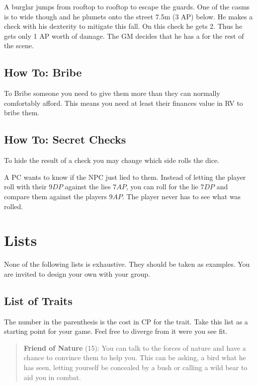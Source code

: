 \documentclass[11pt]{article}
\begin{document}
{\begin{pwexample}
A burglar jumps from rooftop to rooftop to escape the guards. One of the casms is to wide though and he plumets onto the street 7.5m (3 AP) below. He makes a check with his dexterity to mitigate this fall. On this check he gets 2. Thus he gets only 1 AP worth of damage. The GM decides that he has a  for the rest of the scene.
\end{pwexample}
\subsection{How To: Bribe}
\label{sec:orge31ccdb}
To Bribe someone you need to give them more than they can normally comfortably afford. This means you need at least their finances value in RV to bribe them.
\subsection{How To: Secret Checks}
\label{sec:org307faa0}
To hide the result of a check you may change which side rolls the dice.

\begin{pwexample}
A PC wants to know if the NPC just lied to them. Instead of letting the player roll with their \(9 DP\) against the lies \(7 AP\), you can roll for the lie \(7 DP\) and compare them against the players \(9 AP\). The player never has to see what was rolled.
\end{pwexample}
\section{Lists}
\label{sec:org2a09064}
None of the following lists is exhaustive. They should be taken as examples. You are invited to design your own with your group.
\subsection{List of Traits}
\label{sec:orgdba11b8}
The number in the parenthesis is the cost in CP for the trait. Take this list as a starting point for your game. Feel free to diverge from it were you see fit.

\begin{quote}
\textbf{Friend of Nature} (15): You can talk to the forces of nature and have a chance to convince them to help you. This can be asking, a bird what he has seen, letting yourself be concealed by a bush or calling a wild bear to aid you in combat.
\end{quote}

}
\end{document}
